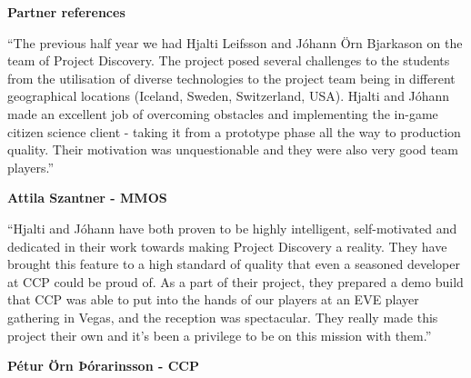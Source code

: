 {\Large
\textbf{Partner references}}

\vspace{0.4cm}

``The previous half year we had Hjalti Leifsson and Jóhann Örn Bjarkason on the team of Project Discovery. The project posed several challenges to the students from the utilisation of diverse technologies to the project team being in different geographical locations (Iceland, Sweden, Switzerland, USA). Hjalti and Jóhann made an excellent job of overcoming obstacles and implementing the in-game citizen science client - taking it from a prototype phase all the way to production quality. Their motivation was unquestionable and they were also very good team players.''

\begin{flushright}
\textbf{Attila Szantner - MMOS}
\end{flushright}


\vspace{0.9cm}

``Hjalti and Jóhann have both proven to be highly intelligent, self-motivated and dedicated in their work towards making Project Discovery a reality. They have brought this feature to a high standard of quality that even a seasoned developer at CCP could be proud of. As a part of their project, they prepared a demo build that CCP was able to put into the hands of our players at an EVE player gathering in Vegas, and the reception was spectacular. They really made this project their own and it’s been a privilege to be on this mission with them.''

\begin{flushright}
\textbf{Pétur Örn Þórarinsson - CCP}
\end{flushright}